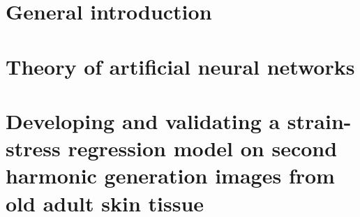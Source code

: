 \documentclass[
	fontsize=10pt, %
	twoside=false, %
	secnumdepth=2, %
	numbers=noenddot,
]{kaobook}
\begin{document}
\let\cleardoublepage\bigskip
\let\clearpage\bigskip

\listoftables %

\endgroup


\mainmatter %

\chapter{General introduction}\label{ch:general_introduction}




\chapter{Theory of artificial neural networks}




\chapter[Skinstression]{Developing and validating a strain-stress regression model on second harmonic generation images from old adult skin tissue}







\end{document}
